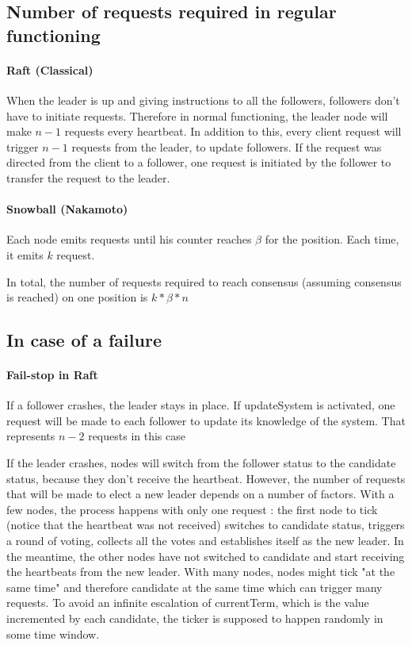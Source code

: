 \documentclass[11pt, twocolumn]{article}
\begin{document}
\subsection{Number of requests required in regular functioning}

\paragraph{Raft (Classical)}
When the leader is up and giving instructions to all the followers, followers don't have to initiate requests.
Therefore in normal functioning, the leader node will make $n-1$ requests every heartbeat.
In addition to this, every client request will trigger $n-1$ requests from the leader, to update followers. If the request was directed from the client to a follower, one request is initiated
by the follower to transfer the request to the leader.

\paragraph{Snowball (Nakamoto)}
Each node emits requests until his counter reaches $\beta$ for the position. Each time, it emits $k$ request.

In total, the number of requests required to reach consensus (assuming consensus is reached) on one position is $k*\beta*n$
\subsection{In case of a failure}
\paragraph{Fail-stop in Raft}
If a follower crashes, the leader stays in place. If updateSystem is activated, one request will be made to each follower to update its knowledge of the system. That represents $n-2$ requests in this case

If the leader crashes, nodes will switch from the follower status to the candidate status, because they don't receive the heartbeat.
However, the number of requests that will be made to elect a new leader depends on a number of factors.
With a few nodes, the process happens with only one request : the first node to tick (notice that the heartbeat was not received) switches to candidate status, triggers a round of voting, collects all the votes and establishes itself as the new leader.
In the meantime, the other nodes have not switched to candidate and start receiving the heartbeats from the new leader.
With many nodes, nodes might tick "at the same time" and therefore candidate at the same time which can trigger many requests. To avoid an infinite escalation of currentTerm, which is the value incremented by each candidate, the ticker is supposed to happen randomly in some time window.
\end{document}
